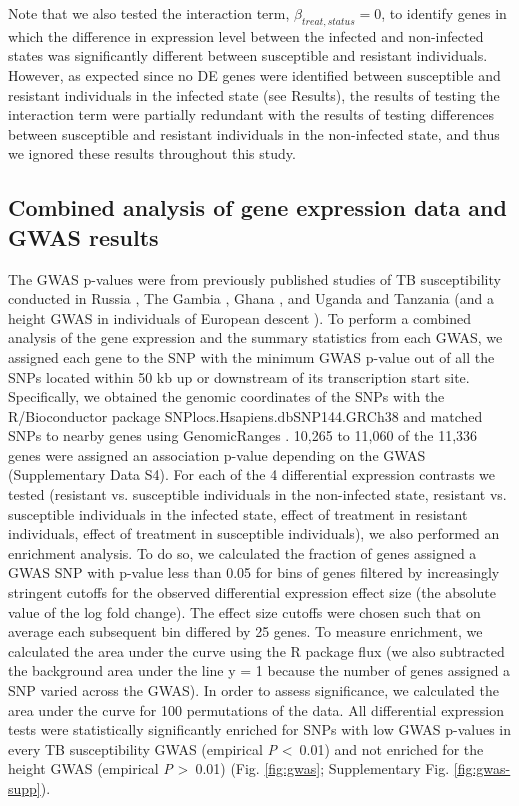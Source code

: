 \documentclass[fleqn,10pt]{wlscirep}
\begin{document}
Note that we also tested the interaction term, $\beta_{treat,status} =
0$, to identify genes in which the difference in expression level
between the infected and non-infected states was significantly
different between susceptible and resistant individuals. However, as
expected since no DE genes were identified between susceptible and
resistant individuals in the infected state (see Results), the results
of testing the interaction term were partially redundant with the
results of testing differences between susceptible and resistant
individuals in the non-infected state, and thus we ignored these
results throughout this study.
\subsection*{Combined analysis of gene expression data and GWAS results}

The GWAS p-values were from previously published studies of TB
susceptibility conducted in Russia \cite{Curtis2015}, The Gambia
\cite{Thye2010}, Ghana \cite{Thye2010}, and Uganda and Tanzania
\cite{Sobota2016} (and a height GWAS in individuals of European
descent \cite{LangoAllen2010}). To perform a combined analysis of the
gene expression and the summary statistics from each GWAS, we assigned
each gene to the SNP with the minimum GWAS p-value out of all the SNPs
located within 50 kb up or downstream of its transcription start site.
Specifically, we obtained the genomic coordinates of the SNPs with the
R/Bioconductor \cite{Huber2015} package
SNPlocs.Hsapiens.dbSNP144.GRCh38 and matched SNPs to nearby genes
using GenomicRanges \cite{Lawrence2013}. 10,265 to 11,060 of the
11,336 genes were assigned an association p-value depending on the
GWAS (Supplementary Data S4). For each of the 4 differential
expression contrasts we tested (resistant vs. susceptible individuals
in the non-infected state, resistant vs. susceptible individuals in
the infected state, effect of treatment in resistant individuals,
effect of treatment in susceptible individuals), we also performed an
enrichment analysis. To do so, we calculated the fraction of genes
assigned a GWAS SNP with p-value less than 0.05 for bins of genes
filtered by increasingly stringent cutoffs for the observed
differential expression effect size (the absolute value of the log
fold change). The effect size cutoffs were chosen such that on average
each subsequent bin differed by 25 genes. To measure enrichment, we
calculated the area under the curve using the R package flux
\cite{Jurasinski2014} (we also subtracted the background area under
the line y = 1 because the number of genes assigned a SNP varied
across the GWAS). In order to assess significance, we calculated the
area under the curve for 100 permutations of the data. All
differential expression tests were statistically significantly
enriched for SNPs with low GWAS p-values in every TB susceptibility
GWAS (empirical \emph{P} \textless \, 0.01) and not enriched for the
height GWAS (empirical \emph{P} \textgreater \, 0.01) (Fig.
\ref{fig:gwas}; Supplementary Fig. \ref{fig:gwas-supp}).
\end{document}
